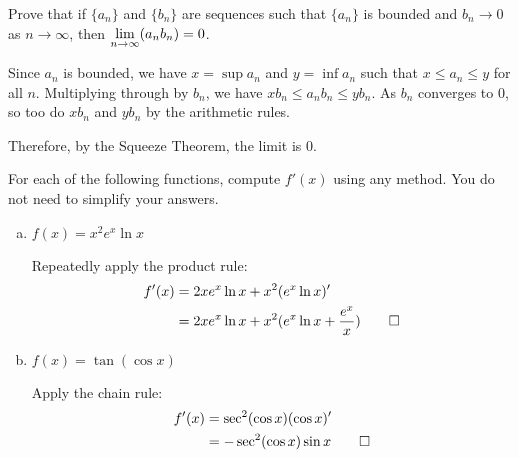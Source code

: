 \documentclass{agony}
\begin{document}
\begin{prob}
  Prove that if $\{a_n\}$ and $\{b_n\}$ are sequences such that $\{a_n\}$ is bounded
  and $b_n \to 0$ as $n \to \infty$, then $\lim\limits_{n\to\infty}(a_n b_n) = 0$.
\end{prob}
\begin{prf}
  Since $a_n$ is bounded, we have $x = \sup a_n$ and $y = \inf a_n$ such that $x \leq a_n \leq y$ for all $n$.
  Multiplying through by $b_n$, we have $xb_n \leq a_n b_n \leq yb_n$.
  As $b_n$ converges to 0, so too do $xb_n$ and $yb_n$ by the arithmetic rules.

  Therefore, by the Squeeze Theorem, the limit is 0.
\end{prf}

\begin{prob}
  For each of the following functions, compute $f'(x)$ using any method.
  You do not need to simplify your answers.
  \begin{enumerate}[(a)]
    \item $f(x) = x^2 e^x \ln x$
          \begin{sol}
            Repeatedly apply the product rule: \begin{align*}
              f'(x) & = 2x e^x \ln x + x^2(e^x \ln x)'                         \\
                    & = 2x e^x \ln x + x^2(e^x \ln x + \frac{e^x}{x}) \qedhere
            \end{align*}
          \end{sol}
    \item $f(x) = \tan(\cos x)$
          \begin{sol}
            Apply the chain rule: \begin{align*}
              f'(x) & = \sec^2(\cos x)(\cos x)'        \\
                    & = -\sec^2(\cos x)\sin x \qedhere
            \end{align*}
          \end{sol}
  \end{enumerate}
\end{prob}
\end{document}
